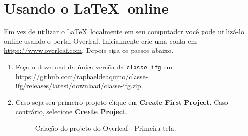 \section{Usando o \LaTeX\ online}

Em vez de utilizar o \LaTeX\ localmente em seu computador você pode utilizá-lo online usando o portal Overleaf. Inicialmente crie uma conta em \url{https://www.overleaf.com}. Depois siga os passos abaixo.

\begin{enumerate}
\item Faça o download da única versão da \texttt{classe-ifg} em \url{https://github.com/raphaeldeaquino/classe-ifg/releases/latest/download/classe-ifg.zip}.
\item Caso seja seu primeiro projeto clique em \textbf{Create First Project}. Caso contrário, selecione \textbf{Create Project}.
\begin{figure}[H]
  \centering
  \caption{Criação do projeto do Overleaf - Primeira tela.}
\end{figure}
\end{enumerate}